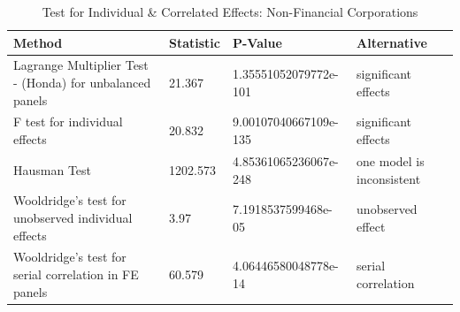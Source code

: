 \begin{table}[ht]
\centering
\caption{ Test for Individual & Correlated Effects: Non-Financial Corporations} 
\begingroup\small
\begin{tabular}{llll}
  \toprule
Method & Statistic & P-Value & Alternative \\ 
  \midrule
Lagrange Multiplier Test -  (Honda) for unbalanced panels & 21.367 & 1.35551052079772e-101 & significant effects \\ 
  F test for individual effects & 20.832 & 9.00107040667109e-135 & significant effects \\ 
  Hausman Test & 1202.573 & 4.85361065236067e-248 & one model is inconsistent \\ 
  Wooldridge's test for unobserved individual effects & 3.97 & 7.1918537599468e-05 & unobserved effect \\ 
  Wooldridge's test for serial correlation in FE panels & 60.579 & 4.06446580048778e-14 & serial correlation \\ 
   \bottomrule
\end{tabular}
\endgroup
\end{table}
